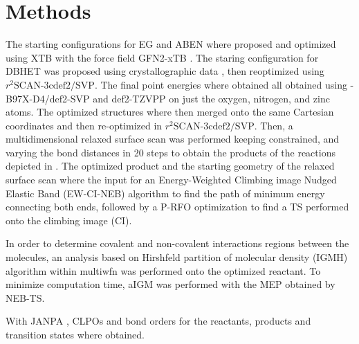 \section{Methods}

The starting configurations for EG and ABEN where proposed and optimized using XTB \cite{Bannwarth2021} with the force field GFN2-xTB \cite{Bannwarth2019}. The staring configuration for DBHET was proposed using crystallographic data \cite{Daubeny1954}, then reoptimized using $r^2\textrm{SCAN-3c}\textrm{def2/SVP}$. The final point energies where obtained all obtained using \chemomega-B97X-D4/def2-SVP and def2-TZVPP on just the oxygen, nitrogen, and  zinc atoms.
The optimized structures where then merged onto the same Cartesian coordinates and then re-optimized in $r^2\textrm{SCAN-3c}\textrm{def2/SVP}$. Then, a multidimensional relaxed surface scan was performed keeping constrained, and varying the bond distances in 20 steps to obtain the products of the reactions depicted in . The optimized product and the starting geometry of the relaxed surface scan where the input for an Energy-Weighted Climbing image Nudged Elastic Band (EW-CI-NEB) \cite{Asgeirsson2021} algorithm to find the path of minimum energy connecting both ends, followed by a P-RFO optimization to find a TS performed onto the climbing image (CI).

In order to determine covalent and non-covalent interactions regions between the molecules, an analysis based on Hirshfeld partition of molecular density (IGMH) algorithm within multiwfn was performed \cite{Lu2021} onto the optimized reactant. To minimize computation time, aIGM was performed with the MEP obtained by NEB-TS.

With JANPA \cite{Nikolaienko2014}, CLPOs and bond orders for the reactants, products and transition states where obtained.
